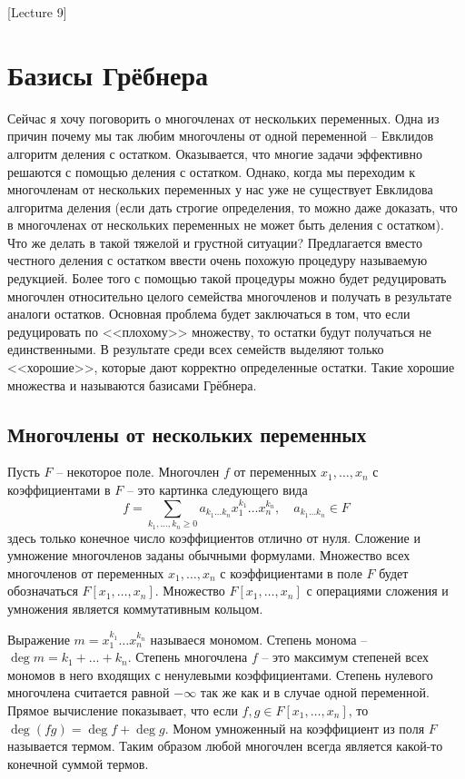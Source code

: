 [Lecture 9]


\section{Базисы Грёбнера}

Сейчас я хочу поговорить о многочленах от нескольких переменных.
Одна из причин почему мы так любим многочлены от одной переменной -- Евклидов алгоритм деления с остатком.
Оказывается, что многие задачи эффективно решаются с помощью деления с остатком.
Однако, когда мы переходим к многочленам от нескольких переменных у нас уже не существует Евклидова алгоритма деления (если дать строгие определения, то можно даже доказать, что в многочленах от нескольких переменных не может быть деления с остатком).
Что же делать в такой тяжелой и грустной ситуации?
Предлагается вместо честного деления с остатком ввести очень похожую процедуру называемую редукцией.
Более того с помощью такой процедуры можно будет редуцировать многочлен относительно целого семейства многочленов и получать в результате аналоги остатков.
Основная проблема будет заключаться в том, что если редуцировать по <<плохому>> множеству, то остатки будут получаться не единственными.
В результате среди всех семейств выделяют только <<хорошие>>, которые дают корректно определенные остатки.
Такие хорошие множества и называются базисами Грёбнера.

\subsection{Многочлены от нескольких переменных}

Пусть $F$ -- некоторое поле.
Многочлен $f$ от переменных  $x_1,\ldots,x_n$ с коэффициентами в $F$ -- это картинка следующего вида
\[
f = \sum_{k_1,\ldots,k_n\geqslant 0} a_{k_1\ldots k_n} x_1^{k_1} \ldots x_n^{k_n},\quad a_{k_1\ldots k_n} \in F
\]
здесь только конечное число коэффициентов отлично от нуля.
Сложение и умножение многочленов заданы обычными формулами.
Множество всех многочленов от переменных $x_1,\ldots,x_n$ с коэффициентами в поле $F$ будет обозначаться $F[x_1,\ldots,x_n]$.
Множество $F[x_1,\ldots,x_n]$ с операциями сложения и умножения является коммутативным кольцом.

Выражение $m = x_1^{k_1}\ldots x_n^{k_n}$ называеся мономом.
Степень монома -- $\deg m = k_1+ \ldots + k_n$.
Степень многочлена $f$ -- это максимум степеней всех мономов в него входящих с ненулевыми коэффициентами.
Степень нулевого многочлена считается равной $-\infty$ так же как и в случае одной переменной.
Прямое вычисление показывает, что если $f,g\in F[x_1,\ldots,x_n]$, то $\deg(fg) = \deg f + \deg g$.
Моном умноженный на коэффициент из поля $F$ называется термом.
Таким образом любой многочлен всегда является какой-то конечной суммой термов.

